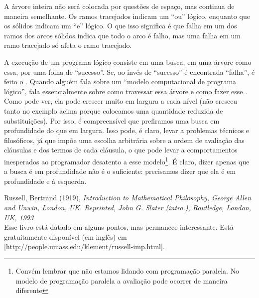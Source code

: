 \documentclass{article}
\begin{document}
A árvore inteira não será colocada por questões de espaço, mas continua de maneira semelhante. Os ramos tracejados indicam
um ``ou'' lógico, enquanto que os sólidos indicam um ``e'' lógico. O que isso significa é que falha em um dos ramos dos arcos
sólidos indica que todo o arco é falho, mas uma falha em um ramo tracejado só afeta o ramo tracejado.

A execução de um programa lógico consiste em uma busca, em uma árvore como essa, por uma folha de ``sucesso''. Se, ao invés
de ``sucesso'' é encontrada ``falha'', é feito o . Quando alguém fala sobre um ``modelo computacional de
programa lógico'', fala essencialmente sobre como travessar essa árvore e como fazer esse .
Como pode ver, ela pode crescer muito em largura a cada nível (não cresceu tanto no exemplo acima porque colocamos uma quantidade reduzida de substituições). Por isso, é compreensível que prefiramos uma busca em profundidade
do que em largura. Isso pode, é claro, levar a problemas técnicos e filosóficos, já que impõe uma escolha arbitrária sobre a ordem
de avaliação das cláusulas e dos termos de cada cláusula, o que pode levar a comportamentos inesperados ao programador desatento a esse modelo\footnote{Convém lembrar que não estamos lidando com programação paralela.
No modelo de programação paralela a avaliação pode ocorrer de maneira
diferente}. É claro, dizer apenas que a busca é em profundidade não é o suficiente: precisamos dizer que ela é em profundidade e
à esquerda.






  \begin{thebibliography}{2}

     Russell, Bertrand (1919), \textit{Introduction to Mathematical Philosophy, George Allen and Unwin, London, UK. Reprinted, John G. Slater (intro.), Routledge, London, UK, 1993}
    \\Esse livro está datado em alguns pontos, mas permanece interessante. Está gratuitamente disponível (em inglês) em [http://people.umass.edu/klement/russell-imp.html].

  \end{thebibliography}
\end{document}
